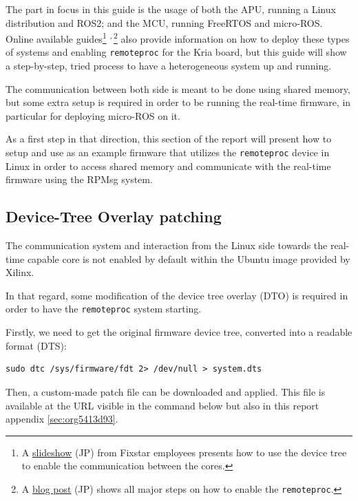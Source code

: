 \documentclass[10pt]{article}
\begin{document}
The part in focus in this guide is the usage of both the APU, running
a Linux distribution and ROS2; and the MCU, running FreeRTOS and micro-ROS.
Online available guides\footnote{A \href{https://speakerdeck.com/fixstars/fpga-seminar-12-fixstars-corporation-20220727}{slideshow} (JP) from Fixstar employees presents how to use the device
tree to enable the communication between the cores.} \textsuperscript{,}\,\footnote{A \href{https://zenn.dev/ryuz88/articles/kv260\_setup\_memo\_ubuntu22 }{blog post} (JP) shows all major steps on how to enable the \texttt{remoteproc}.} also provide information on how to deploy these types
of systems and enabling \texttt{remoteproc} for the Kria board, but this guide
will show a step-by-step, tried process to have a heterogeneous system
up and running.

The communication between both side is meant to be done using shared memory, but
some extra setup is required in order to be running the real-time firmware, in particular
for deploying micro-ROS on it.

As a first step in that direction, this section of the report
will present how to setup and use as an example firmware that utilizes the
\texttt{remoteproc} device in Linux in order to access shared memory
and communicate with the real-time firmware using the RPMsg system.

\subsection{Device-Tree Overlay patching}
\label{sec:orgf3b228f}
The communication system and interaction from the Linux side towards the real-time capable core
is not enabled by default within the Ubuntu image provided by Xilinx.

In that regard, some modification of the device tree overlay (DTO) is required in order to have
the \texttt{remoteproc} system starting.

Firstly, we need to get the original firmware device tree, converted
into a readable format (DTS):

\begin{verbatim}
sudo dtc /sys/firmware/fdt 2> /dev/null > system.dts
\end{verbatim}

Then, a custom-made patch file can be downloaded and applied.
This file is available at the URL visible in the command below
but also in this report appendix \ref{sec:org5413d93}.
\end{document}

